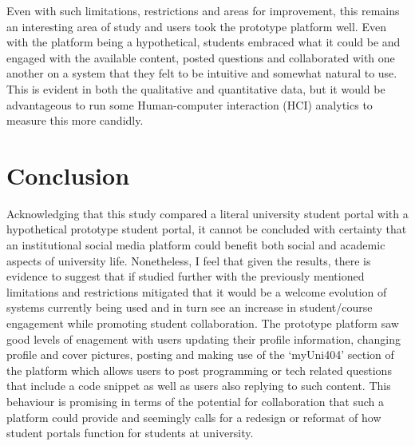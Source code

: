 \documentclass[lettersize,journal]{IEEEtran}
\begin{document}
	Even with such limitations, restrictions and areas for improvement, this remains an interesting area of study and users took the prototype platform well. Even with the platform being a
	hypothetical, students embraced what it could be and engaged with the available content, posted questions and collaborated with one another on a system that they felt to be intuitive and
	somewhat natural to use. This is evident in both the qualitative and quantitative data, but it would be advantageous to run some Human-computer interaction (HCI) analytics to measure
	this more candidly.


\section{Conclusion}
	Acknowledging that this study compared a literal university student portal with a hypothetical prototype student portal, it cannot be concluded with certainty that an institutional
	social media platform could benefit both social and academic aspects of university life. Nonetheless, I feel that given the results, there is evidence to suggest that if studied further 
	with the previously mentioned limitations and restrictions mitigated that it would be a welcome evolution of systems currently being used and in turn see an increase in student/course engagement
	while promoting student collaboration.
	The prototype platform saw good levels of enagement with users updating their profile information, changing profile and cover pictures, posting and making use of the `myUni404' section of the
	platform which allows users to post programming or tech related questions that include a code snippet as well as users also replying to such content. This behaviour is promising in terms of the 
	potential for collaboration that such a platform could provide and seemingly calls for a redesign or reformat of how student portals function for students at university.
\end{document}
